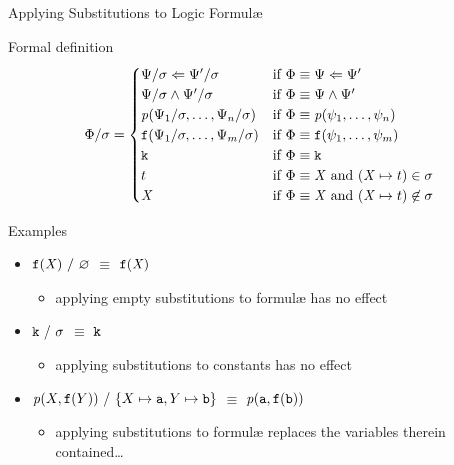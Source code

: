 \documentclass[presentation]{beamer}\mode<presentation>{\usetheme{AMSBolognaFC}}
\begin{document}
\begin{frame}[allowframebreaks]{Applying Substitutions to Logic Formul\ae{}}
\begin{alertblock}{Formal definition}
        $$\Phi / \sigma = \begin{cases}
            \Psi / \sigma \Leftarrow \Psi' / \sigma & \text{if} ~ \Phi \equiv \Psi \Leftarrow \Psi'
            \\
            \Psi / \sigma \wedge \Psi' / \sigma & \text{if} ~ \Phi \equiv \Psi \wedge \Psi'
            \\
            \text{\textit{p}}(\Psi_1 / \sigma, \ldots, \Psi_n / \sigma) & \text{if} ~ \Phi \equiv \text{\textit{p}}(\psi_1, \ldots, \psi_n)
            \\
            \mathtt{f}(\Psi_1 / \sigma, \ldots, \Psi_m / \sigma) & \text{if} ~ \Phi \equiv \mathtt{f}(\psi_1, \ldots, \psi_m)
            \\
            \mathtt{k} & \text{if} ~ \Phi \equiv \mathtt{k}
            \\
            t & \text{if} ~ \Phi \equiv \mathit{X} ~ \text{and} ~ (\mathit{X} \mapsto t) \in \sigma
            \\
            \mathit{X} & \text{if} ~ \Phi \equiv \mathit{X} ~ \text{and} ~ (\mathit{X} \mapsto t) \not\in \sigma
        \end{cases}$$
    \end{alertblock}

    \begin{exampleblock}{Examples}
        \begin{itemize}
            \item[] \alert{$\functor{f}(\variable{X}) \ /\  \varnothing$} $\equiv$ $\mathtt{f}(\mathit{X})$
            \begin{itemize}
                \item applying empty substitutions to formul\ae{} has no effect
            \end{itemize} 

            \item[] \alert{$\functor{k} \ /\  \sigma$} $\equiv$ $\mathtt{k}$
            \begin{itemize}
                \item applying substitutions to constants has no effect
            \end{itemize} 

            \item[] \alert{$\text{\textit{p}}(X, \mathtt{f}(Y)) \ /\  \{ X \mapsto \mathtt{a}, Y \mapsto \mathtt{b} \}$} $\equiv$ $\text{\textit{p}}(\mathtt{a}, \mathtt{f}(\mathtt{b}))$
            \begin{itemize}
                \item applying substitutions to formul\ae{} replaces the variables therein contained\ldots
            \end{itemize} 


\end{itemize}
\end{exampleblock}
\end{frame}
\end{document}
